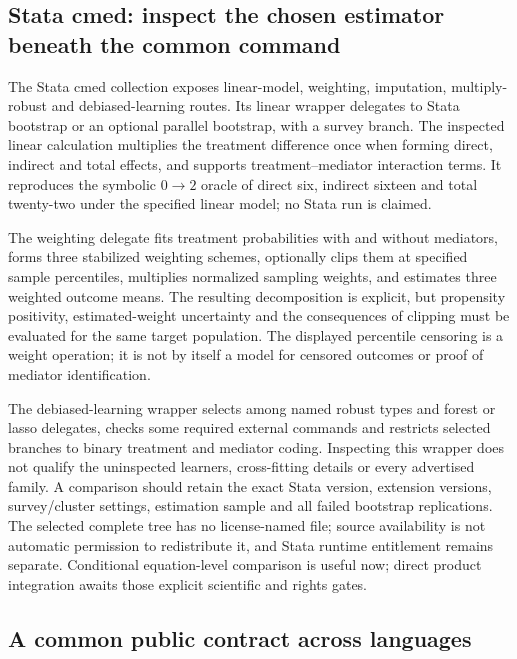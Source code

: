 \subsection{Stata cmed: inspect the chosen estimator beneath the common command}

The Stata cmed collection exposes linear-model, weighting, imputation,
multiply-robust and debiased-learning routes. Its linear wrapper delegates to
Stata bootstrap or an optional parallel bootstrap, with a survey branch. The
inspected linear calculation multiplies the treatment difference once when
forming direct, indirect and total effects, and supports treatment--mediator
interaction terms. It reproduces the symbolic $0\rightarrow2$ oracle of
direct six, indirect sixteen and total twenty-two under the specified linear
model; no Stata run is claimed.\citep{exec25_omed_cmedstata,exec25_omed_choice}

The weighting delegate fits treatment probabilities with and without mediators,
forms three stabilized weighting schemes, optionally clips them at specified
sample percentiles, multiplies normalized sampling weights, and estimates three
weighted outcome means. The resulting decomposition is explicit, but propensity
positivity, estimated-weight uncertainty and the consequences of clipping must
be evaluated for the same target population. The displayed percentile censoring
is a weight operation; it is not by itself a model for censored outcomes or
proof of mediator identification.\citep{exec25_omed_cmedstata}

The debiased-learning wrapper selects among named robust types and forest or
lasso delegates, checks some required external commands and restricts selected
branches to binary treatment and mediator coding. Inspecting this wrapper does
not qualify the uninspected learners, cross-fitting details or every advertised
family. A comparison should retain the exact Stata version, extension versions,
survey/cluster settings, estimation sample and all failed bootstrap replications.
The selected complete tree has no license-named file; source availability is not
automatic permission to redistribute it, and Stata runtime entitlement remains
separate. Conditional equation-level comparison is useful now; direct product
integration awaits those explicit scientific and rights gates.\citep{exec25_omed_cmedstata,exec25_omed_choice}

\subsection{A common public contract across languages}

